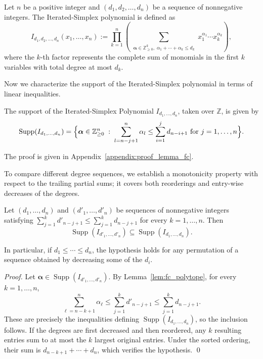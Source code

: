 \begin{definition}
	Let $n$ be a positive integer and $(d_1, d_2, \ldots, d_n)$ be a sequence of nonnegative integers. The Iterated-Simplex polynomial is defined as
	\begin{equation}
		I_{d_1,d_2,\ldots,d_n}(x_1, \ldots, x_n) := \prod_{k=1}^{n} \left( \sum_{\substack{\boldsymbol\alpha \in \mathbb{Z}_{\ge 0}^k,\; \alpha_1 + \cdots + \alpha_k \leq d_k}} x_1^{\alpha_1} \cdots x_k^{\alpha_k} \right),
		\label{eq:Iterated_Simplex_Polynomial}
	\end{equation}
	where the $k$-th factor represents the complete sum of monomials in the first $k$ variables with total degree at most $d_k$.
\end{definition}

Now we characterize the support of the Iterated-Simplex polynomial in terms of linear inequalities.

\begin{lemma}\label{lem:fc_polytope}
	The support of the Iterated-Simplex Polynomial $I_{d_1,\ldots,d_n}$, taken over $\mathbb{Z}$, is given by
\begin{equation}
  \mathrm{Supp}(I_{d_1,\ldots,d_n}) = 
  \Bigl\{ \boldsymbol\alpha \in \mathbb{Z}_{\ge 0}^n \;:\;
  \sum_{l=n-j+1}^n \alpha_l \le \sum_{i=1}^j d_{n-i+1}
  \text{ for } j=1, \ldots, n \Bigr\}.
  \label{eq:support}
\end{equation}
\end{lemma}

The proof is given in Appendix~\ref{appendix:proof_lemma_fc}.

To compare different degree sequences, we establish a monotonicity property with respect to the trailing partial sums; it covers both reorderings and entry-wise decreases of the degrees.

\begin{lemma}\label{lem:reorder_support}
Let $(d_1,\ldots,d_n)$ and $(d'_1,\ldots,d'_n)$ be sequences of nonnegative integers satisfying $\sum_{j=1}^{k} d'_{n-j+1} \leq \sum_{j=1}^{k} d_{n-j+1}$ for every $k=1,\ldots,n$. Then
\[
\operatorname{Supp}(I_{d'_1,\ldots,d'_n}) \subseteq \operatorname{Supp}(I_{d_1,\ldots,d_n}).
\]

In particular, if $d_1\leq\cdots\leq d_n$, the hypothesis holds for any permutation of a sequence obtained by decreasing some of the $d_i$.
\end{lemma}

\begin{proof}
Let $\boldsymbol\alpha\in\operatorname{Supp}(I_{d'_1,\ldots,d'_n})$. By Lemma~\ref{lem:fc_polytope}, for every $k=1,\ldots,n$,
\[
\sum_{\ell=n-k+1}^{n}\alpha_\ell
\le \sum_{j=1}^{k}d'_{n-j+1}
\le \sum_{j=1}^{k}d_{n-j+1}.
\]
These are precisely the inequalities defining $\operatorname{Supp}(I_{d_1,\ldots,d_n})$, so the inclusion follows. If the degrees are first decreased and then reordered, any $k$ resulting entries sum to at most the $k$ largest original entries. Under the sorted ordering, their sum is $d_{n-k+1}+\cdots+d_n$, which verifies the hypothesis.
\qed
\end{proof}


